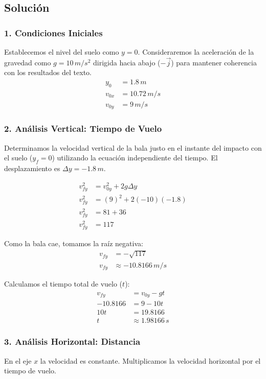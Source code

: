 \documentclass[12pt, a4paper]{article}
\begin{document}
\subsection*{Solución}

\subsubsection*{1. Condiciones Iniciales}
Establecemos el nivel del suelo como $y = 0$. Consideraremos la aceleración de la gravedad como $g = 10 \, \si{m/s^2}$ dirigida hacia abajo ($-\vec{j}$) para mantener coherencia con los resultados del texto.
\begin{align*}
y_0 &= 1.8 \, \si{m} \\
v_{0x} &= 10.72 \, \si{m/s} \\
v_{0y} &= 9 \, \si{m/s}
\end{align*}

\subsubsection*{2. Análisis Vertical: Tiempo de Vuelo}
Determinamos la velocidad vertical de la bala justo en el instante del impacto con el suelo ($y_f = 0$) utilizando la ecuación independiente del tiempo. El desplazamiento es $\Delta y = -1.8 \, \si{m}$.

\begin{align*}
v_{fy}^2 &= v_{0y}^2 + 2g\Delta y \\
v_{fy}^2 &= (9)^2 + 2(-10)(-1.8) \\
v_{fy}^2 &= 81 + 36 \\
v_{fy}^2 &= 117
\end{align*}

Como la bala cae, tomamos la raíz negativa:
\begin{align*}
v_{fy} &= -\sqrt{117} \\
v_{fy} &\approx -10.8166 \, \si{m/s}
\end{align*}

Calculamos el tiempo total de vuelo ($t$):
\begin{align*}
v_{fy} &= v_{0y} - gt \\
-10.8166 &= 9 - 10t \\
10t &= 19.8166 \\
t &\approx 1.98166 \, \si{s}
\end{align*}

\subsubsection*{3. Análisis Horizontal: Distancia}
En el eje $x$ la velocidad es constante. Multiplicamos la velocidad horizontal por el tiempo de vuelo.
\end{document}
